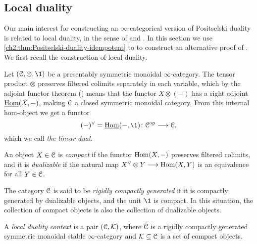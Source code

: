 

\subsection{Local duality}
\label{ch2:ssec:local-duality}

Our main interest for constructing an $\infty$-categorical version of Positselski duality is related to local duality, in the sense of \cite{hovey-palmiery-strickland_97} and \cite{barthel-heard-valenzuela_2018}. In this section we use \cref{ch2:thm:Positselski-duality-idempotent} to to construct an alternative proof of \cite[2.21]{barthel-heard-valenzuela_2018}. We first recall the construction of local duality. 

Let $(\C, \otimes, \1)$ be a presentably symmetric monoidal $\infty$-category. The tensor product $\otimes$ preserves filtered colimits separately in each variable, which by the adjoint functor theorem (\cite[5.5.2.9]{lurie_09}) means that the functor $X\otimes (-)$ has a right adjoint $\operatorname{\underline{Hom}}(X, -)$, making $\EuScript{C}$ a closed symmetric monoidal category. From this internal hom-object we get a functor 
\[(-)^\vee = \iHom(-, \1)\: \C\op \to \C,\] 
which we call \emph{the linear dual}. 

\begin{definition}
    An object $X\in \EuScript{C}$ is \emph{compact} if the functor $\operatorname{Hom}(X, -)$ preserves filtered colimits, and it is \emph{dualizable} if the natural map $X^\vee \otimes Y \longrightarrow \operatorname{Hom}(X,Y)$ is an equivalence for all $Y\in \EuScript{C}$. 
\end{definition}

The category $\EuScript{C}$ is said to be \emph{rigidly compactly generated} if it is compactly generated by dualizable objects, and the unit $\1$ is compact. In this situation, the collection of compact objects is also the collection of dualizable objects. 

\begin{definition}
    A \emph{local duality context} is a pair $(\EuScript{C}, \mathcal{K})$, where $\EuScript{C}$ is a rigidly compactly generated symmetric monoidal stable $\infty$-category and $\mathcal{K}\subseteq \EuScript{C}$ is a set of compact objects. 
\end{definition}

